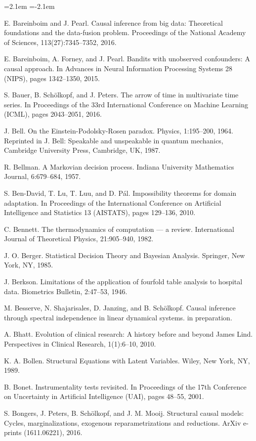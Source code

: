 \begin{list}{}{\leftmargin=2.1em
 \itemindent=-2.1em\parsep=0pt\itemsep=3pt}
\item E. Bareinboim and J. Pearl. Causal inference from big data: Theoretical foundations and the data-fusion problem. Proceedings of the National Academy of Sciences, 113(27):7345--7352, 2016.
\item E. Bareinboim, A. Forney, and J. Pearl. Bandits with unobserved confounders: A causal approach. In Advances in Neural Information Processing Systems 28 (NIPS), pages 1342--1350, 2015.
\item S. Bauer, B. Schölkopf, and J. Peters. The arrow of time in multivariate time series. In Proceedings of the 33rd International Conference on Machine Learning (ICML), pages 2043--2051, 2016.
\item J. Bell. On the Einstein-Podolsky-Rosen paradox. Physics, 1:195--200, 1964. Reprinted in J. Bell: Speakable and unspeakable in quantum mechanics, Cambridge University Press, Cambridge, UK, 1987.
\item R. Bellman. A Markovian decision process. Indiana University Mathematics Journal, 6:679--684, 1957.
\item S. Ben-David, T. Lu, T. Luu, and D. Pál. Impossibility theorems for domain adaptation. In Proceedings of the International Conference on Artificial Intelligence and Statistics 13 (AISTATS), pages 129--136, 2010.
\item C. Bennett. The thermodynamics of computation --- a review. International Journal of Theoretical Physics, 21:905--940, 1982.
\item J. O. Berger. Statistical Decision Theory and Bayesian Analysis. Springer, New York, NY, 1985.
\item J. Berkson. Limitations of the application of fourfold table analysis to hospital data. Biometrics Bulletin, 2:47--53, 1946.
\item M. Besserve, N. Shajarisales, D. Janzing, and B. Schölkopf. Causal inference through spectral independence in linear dynamical systems. in preparation.
\item A. Bhatt. Evolution of clinical research: A history before and beyond James Lind. Perspectives in Clinical Research, 1(1):6--10, 2010.
\item K. A. Bollen. Structural Equations with Latent Variables. Wiley, New York, NY, 1989.
\item B. Bonet. Instrumentality tests revisited. In Proceedings of the 17th Conference on Uncertainty in Artificial Intelligence (UAI), pages 48--55, 2001.
\item S. Bongers, J. Peters, B. Schölkopf, and J. M. Mooij. Structural causal models: Cycles, marginalizations, exogenous reparametrizations and reductions. ArXiv e-prints (1611.06221), 2016.

\end{list}
